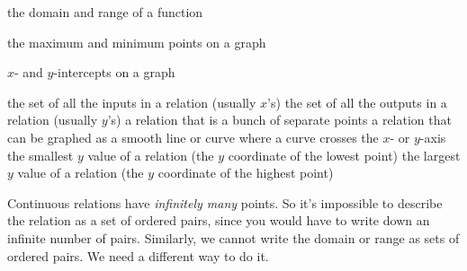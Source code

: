\documentclass[fleqn,letterpaper,12pt,printwatermark=false]{memoir}
\begin{document}
\newcommand{\myClassName}{Pre-AP Algebra 2}
\newcommand{\myUnitNumber}{1}
\newcommand{\myUnitTitle}{Introduction to Functions}
\newcommand{\myLessonNumber}{2}
\newcommand{\myLessonTitle}{Attributes of Relations and Functions}



\pagestyle{myPagestyle}

\checkandfixthelayout
{}

\begin{myNotesHeader}
    \item {} the domain and range of a function
    \item {} the maximum and minimum points on a graph
    \item {} $x$- and $y$-intercepts on a graph
\end{myNotesHeader}

\begin{myVocabulary}
        {
            the set of all the inputs in a relation 
            (usually $x$'s)
        }
        {
            the set of all the outputs in a relation 
            (usually $y$'s)
        }
        {
            a relation that is a bunch of separate points
        }
        {
            a relation that can be graphed as a smooth line or curve
        }
        {
            where a curve crosses the $x$- or $y$-axis
        }
        {
            the smallest $y$ value of a relation (the $y$ coordinate of the lowest point)
        }
        {
            the largest $y$ value of a relation (the $y$ coordinate of the highest point)
        }
\end{myVocabulary}

\begin{myLesson}[][]
    Continuous relations have \emph{infinitely many} points.
    So it's impossible to describe the relation as a set of ordered pairs, since you would have 
    to write down an infinite number of pairs.
    Similarly, we cannot write the domain or range as sets of ordered pairs.
    We need a different way to do it.
\end{myLesson}
\end{document}
